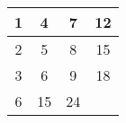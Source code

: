 \documentclass{article}
\begin{document}
\begin{tabular}{|c|c|c|c|}\hline
1 & 4 & 7 & 12\\
\hline
2 & 5 & 8 & 15\\
\hline
3 & 6 & 9 & 18\\
\hline
6 & 15 & 24 & \\
\hline
\end{tabular}
\end{document}
